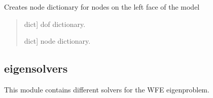 \documentclass[letterpaper,10pt,english]{sphinxmanual}
\begin{document}
\begin{fulllineitems}
\label{\detokenize{core:pywfe.core.model_setup.create_node_dict}}
\pysigstartsignatures
{}
\pysigstopsignatures
\sphinxAtStartPar
Creates node dictionary for nodes on the left face of the model
\begin{quote}\begin{description}
\begin{description}
\sphinxlineitem{\sphinxstylestrong{dof}}{[}dict{]}
\sphinxAtStartPar
dof dictionary.

\end{description}

\begin{description}
\sphinxlineitem{\sphinxstylestrong{node}}{[}dict{]}
\sphinxAtStartPar
node dictionary.

\end{description}

\end{description}\end{quote}

\end{fulllineitems}

\label{\detokenize{core:module-pywfe.core.eigensolvers}}

\subsection{eigensolvers}
\label{\detokenize{core:eigensolvers}}
\sphinxAtStartPar
This module contains different solvers for the WFE eigenproblem.
\end{document}
